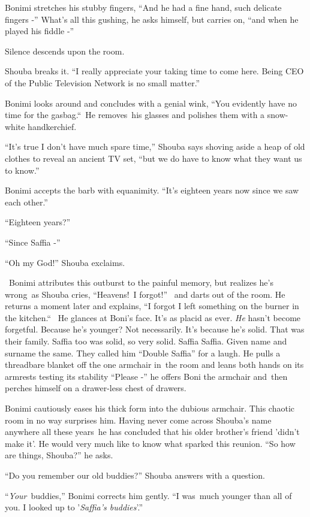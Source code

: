 \documentclass[twoside,11pt]{book}
\begin{document}
Bonimi stretches his stubby fingers, ``And he had a fine hand, such delicate fingers -''
What's all this gushing, he asks himself, but carries on, ``and when he played his fiddle -''

Silence descends upon the room.

Shouba breaks it. ``I really appreciate your taking time to come here. Being CEO of the Public Television
Network is no small matter.''

Bonimi looks around and concludes with a genial wink, ``You evidently have no time for the
gasbag.``\ He removes~his glasses and polishes them with a snow{}-white handkerchief. 

``It's true I don't have much spare time,'' Shouba says shoving aside a heap of old clothes to
reveal an ancient TV set, ``but we do have to know what they want us to know.''

Bonimi accepts the barb with equanimity. ``It's eighteen years now since we saw each other.'' 

``Eighteen years?''

``Since Saffia -'' 

``Oh my God!'' Shouba exclaims.

~Bonimi attributes this outburst to the painful memory, but realizes he's wrong~as Shouba cries,
``Heavens!{\ }I forgot!''
{\ }and darts out of the room. He returns a moment later and explains,
``I forgot I left something on the burner in the kitchen.``~ He glances at Boni's face. It's
as placid as ever. \textit{He} hasn't become forgetful. Because he's younger? Not necessarily. It's because he's solid.
That was their family. Saffia too was solid, so very solid. Saffia Saffia. Given name and surname the same. They called
him ``Double Saffia'' for a laugh. He pulls a threadbare blanket off the one armchair in~the
room and leans both hands on its armrests testing its stability ``Please -'' he offers Boni
the armchair and\ then perches himself on a drawer-less chest of drawers. 

Bonimi cautiously eases his thick form into the dubious armchair. This chaotic room in no way surprises him. Having
never come across Shouba's name anywhere all these years\ he has concluded that his older brother's friend {}'didn't
make it{}'. He would very much like to know what sparked this reunion. ``So how are things,
Shouba?'' he asks.

``Do you remember our old buddies?'' Shouba answers with a question.

``\textit{Your}~buddies,'' Bonimi corrects him gently. ``I was~much younger than all of you. I looked up to
'\textit{Saffia's buddies}{}'.'' 
\end{document}
